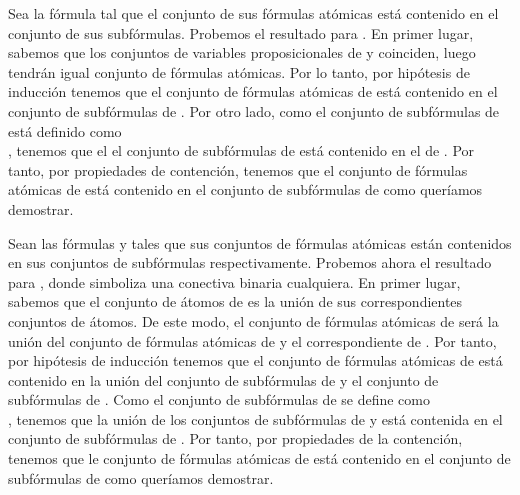 \begin{isabellebody}
\begin{isamarkuptext}
\begin{demostracion}
    Sea la fórmula  tal que el conjunto de sus fórmulas atómicas está
    contenido en el conjunto de sus subfórmulas. Probemos el resultado 
    para . 
    En primer lugar, sabemos que los 
    conjuntos de variables proposicionales de  y  coinciden, 
    luego tendrán igual conjunto de fórmulas atómicas. Por lo tanto,
    por hipótesis de inducción tenemos que el conjunto de fórmulas
    atómicas de  está contenido en el conjunto de subfórmulas de 
    . Por otro lado, como el conjunto de subfórmulas de  está 
    definido como\\ , tenemos que el 
    el conjunto de subfórmulas de  está contenido en el de .
    Por tanto, por propiedades de contención, 
    tenemos que el conjunto de fórmulas atómicas de  está 
    contenido en el conjunto de subfórmulas de  como queríamos 
    demostrar.

    Sean las fórmulas  y  tales que sus conjuntos de fórmulas 
    atómicas están contenidos en sus conjuntos de subfórmulas 
    respectivamente. Probemos ahora el resultado para , donde \isa{{\isacharasterisk}}
    simboliza una conectiva binaria cualquiera.
    En primer lugar, sabemos que el conjunto de átomos de 
    es la unión de sus correspondientes conjuntos de átomos. De este
    modo, el conjunto de fórmulas atómicas de  será la unión del 
    conjunto de fórmulas atómicas de  y el correspondiente de . 
    Por tanto, por hipótesis de inducción tenemos que el conjunto de 
    fórmulas atómicas de  está contenido en la unión del conjunto
    de subfórmulas de  y el conjunto de subfórmulas de . Como el
    conjunto de subfórmulas de  se define como\\
    , tenemos que la unión
    de los conjuntos de subfórmulas de  y  está contenida en el
    conjunto de subfórmulas de . Por tanto, por propiedades
    de la contención, tenemos que le conjunto de fórmulas atómicas de
     está contenido en el conjunto de subfórmulas de  como 
    queríamos demostrar.  
  \end{demostracion}


\end{isamarkuptext}
\end{isabellebody}
